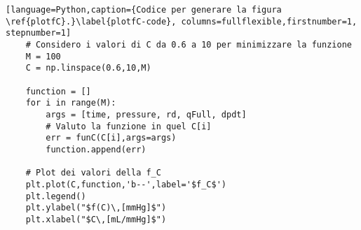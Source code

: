 \begin{lstlisting}[language=Python,caption={Codice per generare la figura \ref{plotfC}.}\label{plotfC-code}, columns=fullflexible,firstnumber=1, stepnumber=1]
    # Considero i valori di C da 0.6 a 10 per minimizzare la funzione
    M = 100
    C = np.linspace(0.6,10,M)

    function = []
    for i in range(M):
        args = [time, pressure, rd, qFull, dpdt]
        # Valuto la funzione in quel C[i]
        err = funC(C[i],args=args)
        function.append(err)

    # Plot dei valori della f_C
    plt.plot(C,function,'b--',label='$f_C$')
    plt.legend()
    plt.ylabel("$f(C)\,[mmHg]$")
    plt.xlabel("$C\,[mL/mmHg]$")
\end{lstlisting}